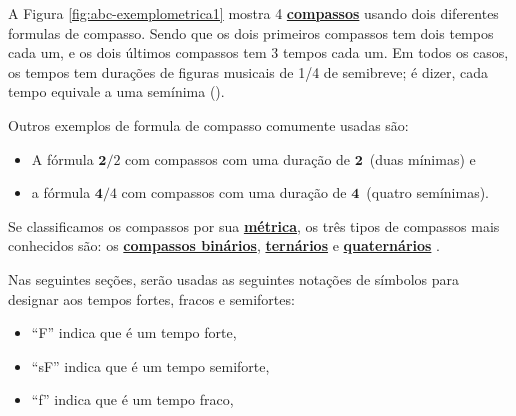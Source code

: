 \begin{description}
\begin{example}
\end{example}
\begin{example}
A Figura \ref{fig:abc-exemplometrica1} mostra 4 \hyperref[def:Compasso]{\textbf{compassos}} usando dois diferentes formulas de compasso.
Sendo que os dois primeiros compassos tem dois tempos cada um, 
e os dois últimos compassos tem 3 tempos cada um.
Em todos os casos, os tempos tem durações de figuras musicais de 1/4 de semibreve;
é dizer, cada tempo equivale a uma semínima (\Vier). 
\end{example}
\begin{example}
Outros exemplos de formula de compasso comumente usadas são:
\begin{itemize}
\item A fórmula $\mathbf{2}/2$ com compassos com uma duração de $\mathbf{2}$\halfnote ~(duas mínimas) e
\item a fórmula $\mathbf{4}/4$ com compassos com uma duração de $\mathbf{4}$\quarternote ~(quatro semínimas). 
\end{itemize}
\end{example}
\end{description}


Se classificamos os compassos por sua \hyperref[def:Metrica]{\textbf{métrica}}, 
os três tipos de compassos mais conhecidos são: 
os \hyperref[subsec:compassobinario]{\textbf{compassos binários}}, 
\hyperref[subsec:compassoternario]{\textbf{ternários}} e 
\hyperref[subsec:compassoquaternario]{\textbf{quaternários}} \cite[pp. 27]{adolfo2002musica}.

\begin{notation}[]
Nas seguintes seções,
serão usadas as seguintes notações de símbolos para designar aos tempos fortes, fracos e semifortes:
\begin{itemize}
\item ``F''  indica que é um tempo forte, 
\item ``sF'' indica que é um tempo semiforte, 
\item ``f''  indica que é um tempo fraco,
\end{itemize}
\end{notation}


